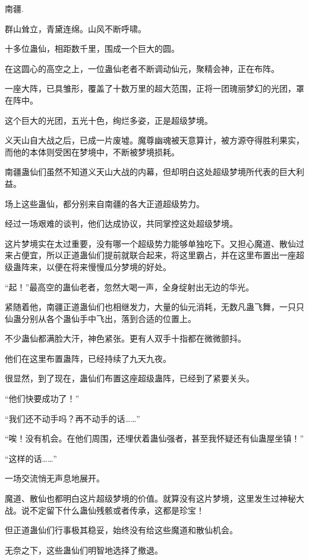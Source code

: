 
\begin{this_body}

南疆.

群山耸立，青黛连绵。山风不断呼啸。

十多位蛊仙，相距数千里，围成一个巨大的圆。

在这圆心的高空之上，一位蛊仙老者不断调动仙元，聚精会神，正在布阵。

一座大阵，已具雏形，覆盖了十数万里的超大范围，正将一团瑰丽梦幻的光团，罩在阵中。

这个巨大的光团，五光十色，绚烂多姿，正是超级梦境。

义天山自大战之后，已成一片废墟。魔尊幽魂被天意算计，被方源夺得胜利果实，而他的本体则受困在梦境中，不断被梦境损耗。

南疆蛊仙们虽然不知道义天山大战的内幕，但却明白这处超级梦境所代表的巨大利益。

场上这些蛊仙，都分别来自南疆的各大正道超级势力。

经过一场艰难的谈判，他们达成协议，共同掌控这处超级梦境。

这片梦境实在太过重要，没有哪一个超级势力能够单独吃下。又担心魔道、散仙过来占便宜，所以正道蛊仙们提前就联合起来，将这里霸占，并在这里布置出一座超级蛊阵来，以便在将来慢慢瓜分梦境的好处。

“起！”最高空的蛊仙老者，忽然大喝一声，全身绽射出无边的华光。

紧随着他，南疆正道蛊仙们也相继发力，大量的仙元消耗，无数凡蛊飞舞，一只只仙蛊分别从各个蛊仙手中飞出，落到合适的位置上。

不少蛊仙都满脸大汗，神色紧张。更有人双手十指都在微微颤抖。

他们在这里布置蛊阵，已经持续了九天九夜。

很显然，到了现在，蛊仙们布置这座超级蛊阵，已经到了紧要关头。

“他们快要成功了！”

“我们还不动手吗？再不动手的话……”

“唉！没有机会。在他们周围，还埋伏着蛊仙强者，甚至我怀疑还有仙蛊屋坐镇！”

“这样的话……”

一场交流悄无声息地展开。

魔道、散仙也都明白这片超级梦境的价值。就算没有这片梦境，这里发生过神秘大战。说不定留下什么蛊仙残骸或者传承，这都是珍宝！

但正道蛊仙们行事极其稳妥，始终没有给这些魔道和散仙机会。

无奈之下，这些蛊仙们明智地选择了撤退。


\end{this_body}
